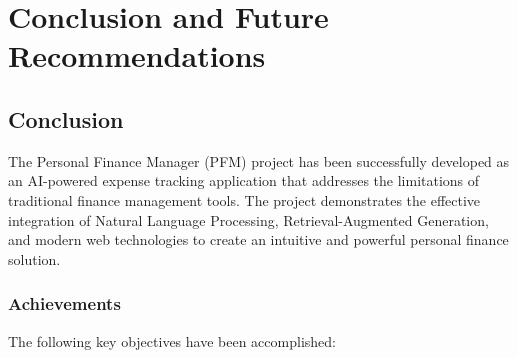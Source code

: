 
\chapter{Conclusion and Future Recommendations}

\section{Conclusion}

The Personal Finance Manager (PFM) project has been successfully developed as an AI-powered expense tracking application that addresses the limitations of traditional finance management tools. The project demonstrates the effective integration of Natural Language Processing, Retrieval-Augmented Generation, and modern web technologies to create an intuitive and powerful personal finance solution.

\subsection{Achievements}

The following key objectives have been accomplished:

